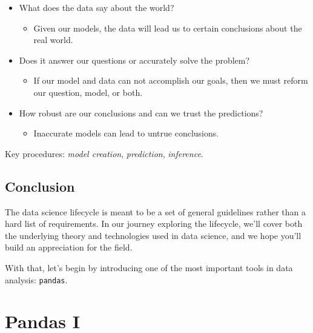 \documentclass[
  letterpaper,
  DIV=11,
  numbers=noendperiod]{scrreprt}
\providecommand{\tightlist}{%
  \setlength{\itemsep}{0pt}\setlength{\parskip}{0pt}}\usepackage{longtable,booktabs,array}
\begin{document}
\begin{itemize}
\tightlist
\item
  What does the data say about the world?

  \begin{itemize}
  \tightlist
  \item
    Given our models, the data will lead us to certain conclusions about
    the real world.\\
  \end{itemize}
\item
  Does it answer our questions or accurately solve the problem?

  \begin{itemize}
  \tightlist
  \item
    If our model and data can not accomplish our goals, then we must
    reform our question, model, or both.\\
  \end{itemize}
\item
  How robust are our conclusions and can we trust the predictions?

  \begin{itemize}
  \tightlist
  \item
    Inaccurate models can lead to untrue conclusions.
  \end{itemize}
\end{itemize}

Key procedures: \emph{model creation}, \emph{prediction},
\emph{inference}.

\hypertarget{conclusion}{%
\section{Conclusion}\label{conclusion}}

The data science lifecycle is meant to be a set of general guidelines
rather than a hard list of requirements. In our journey exploring the
lifecycle, we'll cover both the underlying theory and technologies used
in data science, and we hope you'll build an appreciation for the field.

With that, let's begin by introducing one of the most important tools in
data analysis: \texttt{pandas}.


\hypertarget{pandas-i}{%
\chapter{Pandas I}\label{pandas-i}}
\end{document}
